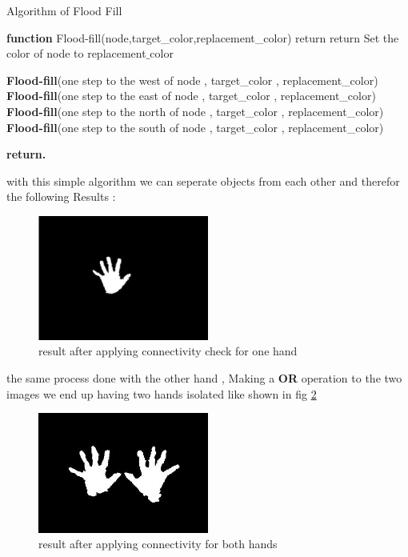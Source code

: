 \begin{algorithm}

\caption{Algorithm of Flood Fill }

\textbf{function}  Flood-fill(node,target\_color,replacement\_color) 
\newline
{}
    {
     return
    }
\newline
{}
    {
     return
    }
Set the color of node to replacement$\_$color 


\textbf{Flood-fill}(one step to the west of node , target\_color , replacement\_color)\\
\textbf{Flood-fill}(one step to the east of node , target\_color , replacement\_color)\\
\textbf{Flood-fill}(one step to the north of node , target\_color , replacement\_color)\\
\textbf{Flood-fill}(one step to the south of node , target\_color , replacement\_color)
\newline

\textbf{return.} 
\end{algorithm}
\newline

with this simple algorithm we can seperate objects from each other and therefor the following  Results : \\
 
 \begin{figure}[H]
\centering
\includegraphics[width=0.5\textwidth]{img/finalresult.png}
\caption{result after applying connectivity check for one hand  }
\label{fig:cam11}
\end{figure}


the same process done with the other hand , Making a \textbf{OR } operation to the two images we end up having two hands isolated like shown in fig \ref{fig:twohd}

 \begin{figure}[H]
\centering
\includegraphics[width=0.5\textwidth]{img/twohands.jpg}
\caption{result after applying connectivity for both hands  }
\label{fig:twohd}
\end{figure}


